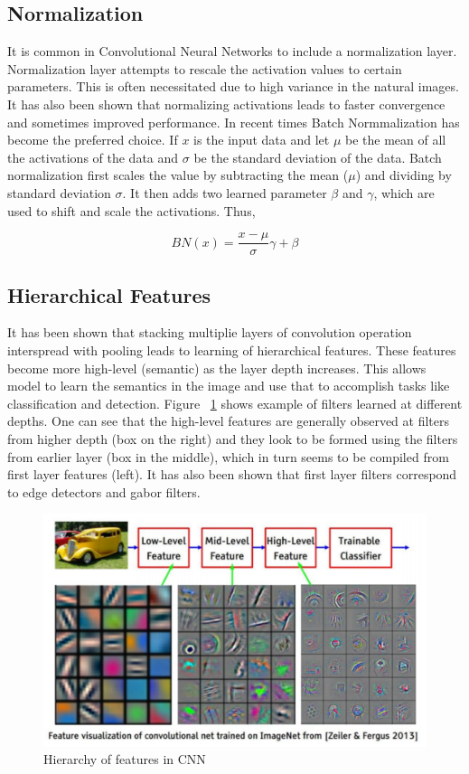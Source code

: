 \subsection{Normalization}

It is common in Convolutional Neural Networks to include a normalization layer. Normalization layer attempts to rescale the activation values to certain parameters. This is often necessitated due to high variance in the natural images. It has also been shown that normalizing activations leads to faster convergence and sometimes improved performance. In recent times Batch Normmalization has become the preferred choice. If $x$ is the input data and let $\mu$ be the mean of all the activations of the data and $\sigma$ be the standard deviation of the data. Batch normalization first scales the value by subtracting the mean ($\mu$) and dividing by standard deviation $\sigma$. It then adds two learned parameter $\beta$ and $\gamma$, which are used to shift and scale the activations. Thus,

$$
BN(x) = \frac{x-\mu}{\sigma} \gamma + \beta
$$

\subsection{Hierarchical Features}
It has been shown that stacking multiplie layers of convolution operation interspread with pooling leads to learning of hierarchical features. These features become more high-level (semantic) as the layer depth increases. This allows model to learn the semantics in the image and use that to accomplish tasks like classification and detection. Figure ~\ref{fig:features} shows example of filters learned at different depths. One can see that the high-level features are generally observed at filters from higher depth (box on the right) and they look to be formed using the filters from earlier layer (box in the middle), which in turn seems to be compiled from first layer features (left). It has also been shown that first layer filters correspond to edge detectors and gabor filters.

\begin{figure}[H]
	\centering
   \includegraphics[scale=0.56]{figures/intro/features.png}
   \caption[Hierarchy of features]{Hierarchy of features in CNN}
   \label{fig:features}
\end{figure}

